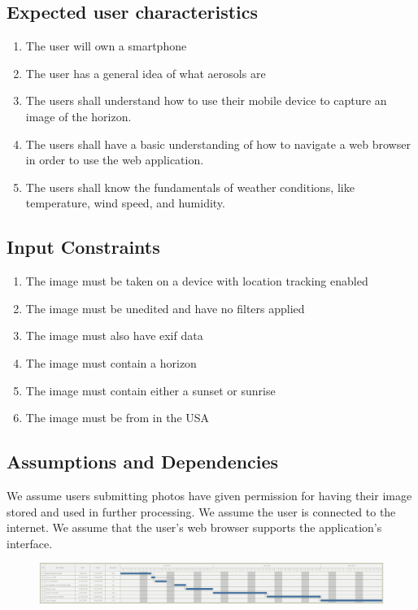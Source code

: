 \documentclass[journal,10pt,draftclsnofoot,onecolumn]{IEEEtran}
\begin{document}
\begin{singlespace}
\subsection{Expected user characteristics}
\begin{enumerate}
\item The user will own a smartphone
\item The user has a general idea of what aerosols are
\item The users shall understand how to use their mobile device to capture an image of the horizon.
\item The users shall have a basic understanding of how to navigate a web browser in order to use the web application.
\item The users shall know the fundamentals of weather conditions, like temperature, wind speed, and humidity.
\end{enumerate}

\subsection{Input Constraints}
\begin{enumerate}
\item The image must be taken on a device with location tracking enabled
\item The image must be unedited and have no filters applied
\item The image must also have exif data
\item The image must contain a horizon
\item The image must contain either a sunset or sunrise
\item The image must be from in the USA
\end{enumerate}

\subsection{Assumptions and Dependencies}
We assume users submitting photos have given permission for having their image stored and used in further processing.
We assume the user is connected to the internet.
We assume that the user's web browser supports the application's interface.
\begin{figure}
\includegraphics[width=\linewidth]{gantt.png}
\end{figure}

\end{singlespace}
\end{document}
